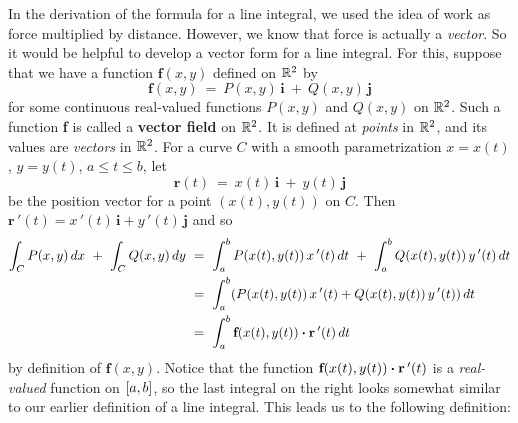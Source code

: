 In the derivation of the formula for a line integral, we used the idea of work as force multiplied by distance.
However, we know that force is actually a \emph{vector}. So it would be helpful to develop a vector form for a
line integral. For this, suppose that we have a function $\textbf{f}(x,y)$ defined on $\mathbb{R}^{2}$ by
\begin{displaymath}
 \textbf{f}(x,y) ~=~ P(x,y)\,\textbf{i} ~+~ Q(x,y)\,\textbf{j}
\end{displaymath}
for some continuous real-valued functions $P(x,y)$ and $Q(x,y)$ on $\mathbb{R}^{2}$. Such a function \textbf{f} is called a
\textbf{vector field} on $\mathbb{R}^{2}$. It is defined at \emph{points} in $\mathbb{R}^{2}$, and its values are
\emph{vectors} in $\mathbb{R}^{2}$. For a curve $C$ with a smooth parametrization $x=x(t)$, $y=y(t)$, $a \le t \le b$,
let
\begin{displaymath}
 \textbf{r}(t) ~=~ x(t)\,\textbf{i} ~+~ y(t)\,\textbf{j}
\end{displaymath}
be the position vector for a point $(x(t),y(t))$ on $C$. Then
$\textbf{r}\,'(t) = x\,'(t)\,\textbf{i} + y\,'(t)\,\textbf{j}$ and so
\begin{align*}
 \int_C P(x,y)\,dx ~+~ \int_C Q(x,y)\,dy ~&=~ \int_a^b P(x(t),y(t)) \,x\,'(t)\,dt ~+~ \int_a^b Q(x(t),y(t)) \,y\,'(t)\,dt\\
  &=~ \int_a^b (P(x(t),y(t)) \,x\,'(t) + Q(x(t),y(t)) \,y\,'(t))\,dt\\
  &=~ \int_a^b \textbf{f}(x(t),y(t)) \bm{\cdot} \textbf{r}\,'(t)\,dt
\end{align*}
by definition of $\textbf{f}(x,y)$. Notice that the function $\textbf{f}(x(t),y(t)) \bm{\cdot} \textbf{r}\,'(t)$
is a \emph{real-valued} function on $\lbrack a,b \rbrack$, so the last integral on the right looks somewhat similar to our
earlier definition of a line integral. This leads us to the following definition:

